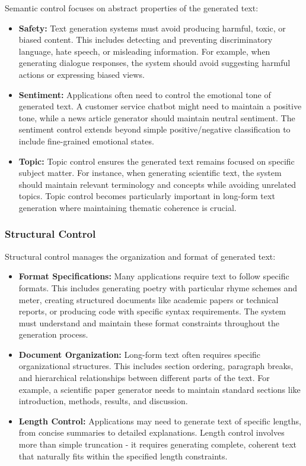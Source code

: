 Semantic control focuses on abstract properties of the generated text:

\begin{itemize}
   \item \textbf{Safety:} Text generation systems must avoid producing harmful, toxic, or biased content. This includes detecting and preventing discriminatory language, hate speech, or misleading information. For example, when generating dialogue responses, the system should avoid suggesting harmful actions or expressing biased views.
   
   \item \textbf{Sentiment:} Applications often need to control the emotional tone of generated text. A customer service chatbot might need to maintain a positive tone, while a news article generator should maintain neutral sentiment. The sentiment control extends beyond simple positive/negative classification to include fine-grained emotional states.
   
   \item \textbf{Topic:} Topic control ensures the generated text remains focused on specific subject matter. For instance, when generating scientific text, the system should maintain relevant terminology and concepts while avoiding unrelated topics. Topic control becomes particularly important in long-form text generation where maintaining thematic coherence is crucial.
\end{itemize}

\subsubsection{Structural Control}

Structural control manages the organization and format of generated text:

\begin{itemize}
   \item \textbf{Format Specifications:} Many applications require text to follow specific formats. This includes generating poetry with particular rhyme schemes and meter, creating structured documents like academic papers or technical reports, or producing code with specific syntax requirements. The system must understand and maintain these format constraints throughout the generation process.
   
   \item \textbf{Document Organization:} Long-form text often requires specific organizational structures. This includes section ordering, paragraph breaks, and hierarchical relationships between different parts of the text. For example, a scientific paper generator needs to maintain standard sections like introduction, methods, results, and discussion.
   
   \item \textbf{Length Control:} Applications may need to generate text of specific lengths, from concise summaries to detailed explanations. Length control involves more than simple truncation - it requires generating complete, coherent text that naturally fits within the specified length constraints.
\end{itemize}

